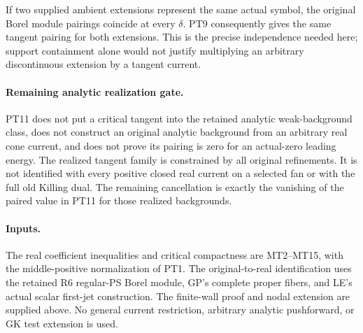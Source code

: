 If two supplied ambient extensions represent the same actual
symbol, the original Borel module pairings coincide at every
$\delta$.  PT9 consequently gives the same tangent pairing
for both extensions.  This is the precise independence needed
here; support containment alone would not justify multiplying
an arbitrary discontinuous extension by a tangent current.

\paragraph{Remaining analytic realization gate.}
PT11 does not put a critical tangent into the retained analytic
weak-background class, does not construct an original analytic
background from an arbitrary real cone current, and does not
prove its pairing is zero for an actual-zero leading energy.
The realized tangent family is constrained by all original
refinements.  It is not identified with every positive closed
real current on a selected fan or with the full old Killing
dual.  The remaining cancellation is exactly the vanishing
of the paired value in PT11 for those realized backgrounds.

\paragraph{Inputs.}
The real coefficient inequalities and critical compactness are
MT2--MT15, with the middle-positive normalization of PT1.
The original-to-real identification uses the retained R6
regular-PS Borel module, GP's complete proper fibers, and
LE's actual scalar first-jet construction.  The finite-wall
proof and nodal extension are supplied above.  No general
current restriction, arbitrary analytic pushforward, or GK
test extension is used.

